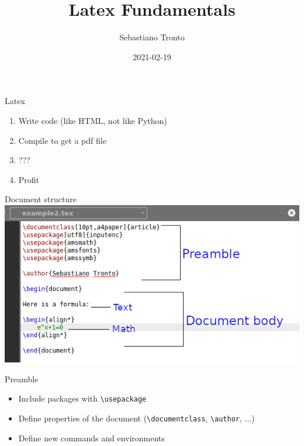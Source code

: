 \documentclass[11pt]{beamer}
\author[\texttt{sebastiano.tronto@uni.lu}]{Sebastiano Tronto}
\title{Latex Fundamentals}
\date{2021-02-19}
\newcommand{\bs}{\textbackslash}
\begin{document}
\begin{frame}
  \titlepage
\end{frame}

\begin{frame}{Latex}
  \begin{enumerate}
    \item Write code (like HTML, not like Python)
    \item Compile to get a pdf file
    \item ???
    \item Profit
  \end{enumerate}
\end{frame}


\begin{frame}{Document structure}
  \includegraphics[scale=0.5]{img/example2-preamble-edited.png}
\end{frame}

\begin{frame}{Preamble}
  \begin{itemize}
    \item Include packages with \texttt{\bs usepackage}
    \item Define properties of the document (\texttt{\bs documentclass},
          \texttt{\bs author}, ...)
    \item Define new commands and environments
  \end{itemize}
\end{frame}
\end{document}
